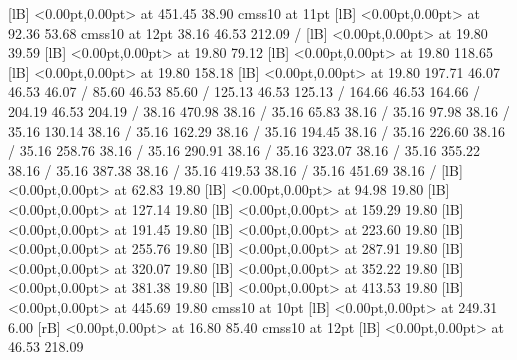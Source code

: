 {  [lB] <0.00pt,0.00pt> at 451.45 38.90
\font\picfont cmss10 at 11pt\picfont
{}  [lB] <0.00pt,0.00pt> at 92.36 53.68
\font\picfont cmss10 at 12pt\picfont
\setsolid
{} 38.16 46.53 212.09 /
  [lB] <0.00pt,0.00pt> at 19.80 39.59
  [lB] <0.00pt,0.00pt> at 19.80 79.12
  [lB] <0.00pt,0.00pt> at 19.80 118.65
  [lB] <0.00pt,0.00pt> at 19.80 158.18
  [lB] <0.00pt,0.00pt> at 19.80 197.71
\setsolid
{} 46.07 46.53 46.07 /
\setsolid
{} 85.60 46.53 85.60 /
\setsolid
{} 125.13 46.53 125.13 /
\setsolid
{} 164.66 46.53 164.66 /
\setsolid
{} 204.19 46.53 204.19 /
\setsolid
{} 38.16 470.98 38.16 /
\setsolid
{} 35.16 65.83 38.16 /
\setsolid
{} 35.16 97.98 38.16 /
\setsolid
{} 35.16 130.14 38.16 /
\setsolid
{} 35.16 162.29 38.16 /
\setsolid
{} 35.16 194.45 38.16 /
\setsolid
{} 35.16 226.60 38.16 /
\setsolid
{} 35.16 258.76 38.16 /
\setsolid
{} 35.16 290.91 38.16 /
\setsolid
{} 35.16 323.07 38.16 /
\setsolid
{} 35.16 355.22 38.16 /
\setsolid
{} 35.16 387.38 38.16 /
\setsolid
{} 35.16 419.53 38.16 /
\setsolid
{} 35.16 451.69 38.16 /
  [lB] <0.00pt,0.00pt> at 62.83 19.80
  [lB] <0.00pt,0.00pt> at 94.98 19.80
  [lB] <0.00pt,0.00pt> at 127.14 19.80
  [lB] <0.00pt,0.00pt> at 159.29 19.80
  [lB] <0.00pt,0.00pt> at 191.45 19.80
  [lB] <0.00pt,0.00pt> at 223.60 19.80
  [lB] <0.00pt,0.00pt> at 255.76 19.80
  [lB] <0.00pt,0.00pt> at 287.91 19.80
  [lB] <0.00pt,0.00pt> at 320.07 19.80
  [lB] <0.00pt,0.00pt> at 352.22 19.80
  [lB] <0.00pt,0.00pt> at 381.38 19.80
  [lB] <0.00pt,0.00pt> at 413.53 19.80
  [lB] <0.00pt,0.00pt> at 445.69 19.80
\font\picfont cmss10 at 10pt\picfont
{}  [lB] <0.00pt,0.00pt> at 249.31 6.00
 [rB] <0.00pt,0.00pt> at 16.80 85.40
\font\picfont cmss10 at 12pt\picfont
{}  [lB] <0.00pt,0.00pt> at 46.53 218.09
\endpicture
}
